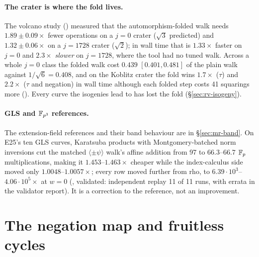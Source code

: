 \paragraph{The crater is where the fold lives.} The volcano study
() measured that the automorphism-folded
walk needs $1.89\pm0.09\times$ fewer operations on a $j=0$ crater ($\sqrt3$
predicted) and $1.32\pm0.06\times$ on a $j=1728$ crater ($\sqrt2$); in wall
time that is $1.33\times$ faster on $j=0$ and $2.3\times$ \emph{slower} on
$j=1728$, where the tool had no tuned walk. Across a whole $j=0$ class the
folded walk cost $0.439$ $[0.401,0.481]$ of the plain walk against
$1/\sqrt6=0.408$, and on the Koblitz crater the fold wins $1.7\times$ ($\tau$)
and $2.2\times$ ($\tau$ and negation) in wall time although each folded
step costs 41 squarings more ().
Every curve the isogenies lead to has lost the fold
(\S\ref{sec:rv-isogeny}).

\paragraph{GLS and $\mathbb{F}_{p^3}$ references.} The extension-field references
and their band behaviour are in \S\ref{sec:mr-band}. On E25's ten GLS curves,
Karatsuba products with Montgomery-batched norm inversions cut the matched
$\langle\pm\psi\rangle$ walk's affine addition from 97 to $66.3$--$66.7$
$\mathbb{F}_p$ multiplications, making it $1.453$--$1.463\times$ cheaper while the
index-calculus side moved only $1.0048$--$1.0057\times$; every row moved
further from rho, to $6.39\cdot10^3$--$4.06\cdot10^5\times$ at $w=0$
(, validated: independent
replay 11 of 11 runs, with errata in the validator report). It is a
correction to the reference, not an improvement.

\section{The negation map and fruitless cycles}\label{sec:rv-negation}

